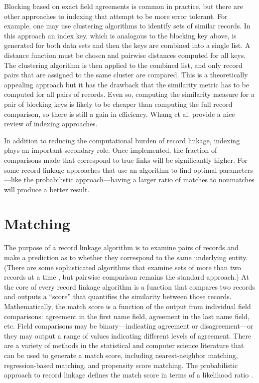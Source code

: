 \documentclass[]{krantz}
\begin{document}
Blocking based on exact field agreements is common in practice, but
there are other approaches to indexing that attempt to be more error
tolerant. For example, one may use clustering algorithms to identify
sets of similar records. In this approach an index key, which is
analogous to the blocking key above, is generated for both data sets and
then the keys are combined into a single list. A distance function must
be chosen and pairwise distances computed for all keys. The clustering
algorithm is then applied to the combined list, and only record pairs
that are assigned to the same cluster are compared. This is a
theoretically appealing approach but it has the drawback that the
similarity metric has to be computed for all pairs of records. Even so,
computing the similarity measure for a pair of blocking keys is likely
to be cheaper than computing the full record comparison, so there is
still a gain in efficiency. Whang et al. \citeyearpar{whang2009entity}
provide a nice review of indexing approaches.

In addition to reducing the computational burden of record linkage,
indexing plays an important secondary role. Once implemented, the
fraction of comparisons made that correspond to true links will be
significantly higher. For some record linkage approaches that use an
algorithm to find optimal parameters---like the probabilistic
approach---having a larger ratio of matches to nonmatches will produce a
better result.

\section{Matching}\label{matching}

The purpose of a record linkage algorithm is to examine pairs of records
and make a prediction as to whether they correspond to the same
underlying entity. (There are some sophisticated algorithms that examine
sets of more than two records at a time \citep{steorts2014smered}, but
pairwise comparison remains the standard approach.) At the core of every
record linkage algorithm is a function that compares two records and
outputs a ``score'' that quantifies the similarity between those
records. Mathematically, the match score is a function of the output
from individual field comparisons: agreement in the first name field,
agreement in the last name field, etc. Field comparisons may be
binary---indicating agreement or disagreement---or they may output a
range of values indicating different levels of agreement. There are a
variety of methods in the statistical and computer science literature
that can be used to generate a match score, including nearest-neighbor
matching, regression-based matching, and propensity score matching. The
probabilistic approach to record linkage defines the match score in
terms of a likelihood ratio \citep{FS69}.
\end{document}
